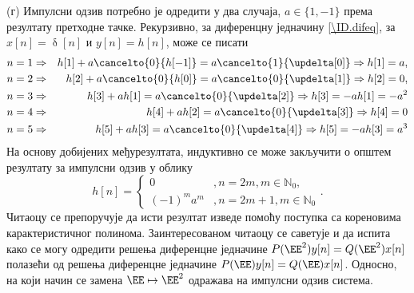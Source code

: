 (г) Импулсни одзив потребно је одредити у два случаја, $a \in \{1,-1\}$ према резултату претходне тачке. 
Рекурзивно, за диференцну једначину \eqref{\ID.difeq}, за $x[n] = \updelta[n]$ и $y[n] = h[n]$, може се писати 
\begin{eqnarray}
    n = 1 &\Rightarrow& h[1] + a \cancelto{0}{h[-1]} = a \cancelto{1}{\updelta[0]} 
    \Rightarrow h[1] = a, \\
    n = 2 &\Rightarrow& h[2] + a \cancelto{0}{h[0]} = a \cancelto{0}{\updelta[1]} 
    \Rightarrow h[2] = 0, \\
    n = 3 &\Rightarrow& h[3] + a h[1] = a \cancelto{0}{\updelta[2]} 
    \Rightarrow h[3] = - a h[1] = - a^2 \\
    n = 4 &\Rightarrow& h[4] + a h[2] = a \cancelto{0}{\updelta[3]} 
    \Rightarrow h[4] = 0 \\
    n = 5 &\Rightarrow& h[5] + a h[3] = a \cancelto{0}{\updelta[4]} 
    \Rightarrow h[5] = - a h[3] = a^3 \\
\end{eqnarray}
На основу добијених међурезултата, индуктивно се може закључити о општем резултату за импулсни одзив у облику 
\begin{equation}
    h[n] = 
    \begin{cases}
        0 &, n = 2m, m \in \mathbb N_0, \\
        (-1)^m a^{m} &, n = 2m + 1, m \in \mathbb N_0 
    \end{cases}.
\end{equation}
Читаоцу се препоручује да исти резултат изведе помоћу поступка са кореновима карактеристичног полинома.  
Заинтересованом читаоцу се саветује и да испита како се могу одредити 
решења диференцне једначине $P(\EE^2) y[n] = Q(\EE^2) x[n]$ полазећи од решења диференцне  
једначине $P(\EE) y[n] = Q(\EE) x[n]$. Односно, на који начин се замена $\EE \mapsto \EE^2$ 
одражава на импулсни одзив система. 